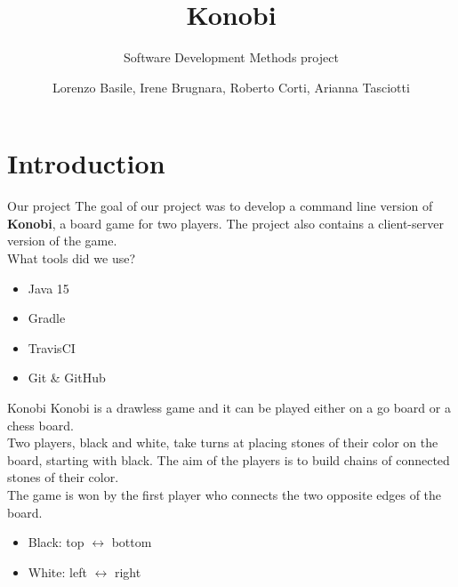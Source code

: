 \documentclass{beamer}
\title{\huge Konobi}
\date{}
\subtitle{Software Development Methods project}
\author{Lorenzo Basile, Irene Brugnara, Roberto Corti, Arianna Tasciotti}
\begin{document}
	
  \maketitle
  \section{Introduction}
  
  \begin{frame}{Our project}
    The goal of our project was to develop a command line version of \textbf{Konobi}, a board game for two players. The project also contains a client-server version of the game.
    \vspace{0.7cm}
    \pause
    \\What tools did we use?
    \begin{itemize}
	    \item Java 15
	    \item Gradle
	    \item TravisCI
	    \item Git \& GitHub
    \end{itemize}

  \end{frame}
  
  \begin{frame}{Konobi}
	    Konobi is a drawless game and it can be played either on a go board or a chess board.
	    \\Two players, black and white, take turns at placing stones of their color on the board, starting with black. The aim of the players is to build chains of connected stones of their color.
	    \vspace{0.5cm}
	    \pause
	    \\The game is won by the first player who connects the two opposite edges of the board.
	    \begin{itemize}
	    \item Black: top $\leftrightarrow$ bottom
	    \item White: left $\leftrightarrow$ right
	    \end{itemize}
   \end{frame}
      
\end{document}
